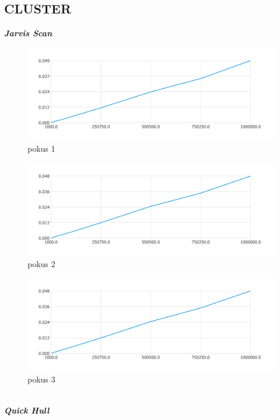 \documentclass{article}
\begin{document}
\subsection{CLUSTER}
\textit{\textbf {Jarvis Scan}}
\\
\begin{figure}[htbp]
\centering
        \includegraphics[clip, trim=0cm 0cm 0cm 0cm, width=1\textwidth]{pdf19.pdf}
        \caption{pokus 1}
\end{figure}
\begin{figure}[htbp]
\centering
        \includegraphics[clip, trim=0cm 0cm 0cm 0cm, width=1\textwidth]{pdf20.pdf}
        \caption{pokus 2}
\end{figure}
\begin{figure}[htbp]
\centering
        \includegraphics[clip, trim=0cm 0cm 0cm 0cm, width=1\textwidth]{pdf21.pdf}
        \caption{pokus 3}
\end{figure}
\\
\clearpage
\newpage
\textit{\textbf {Quick Hull}}
\\
\end{document}
